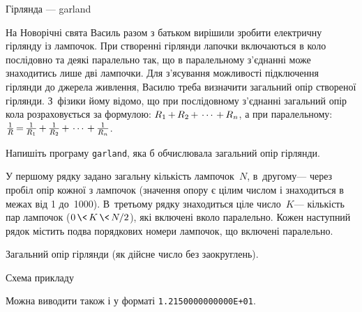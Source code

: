\begin{problemAllDefault}{Гірлянда --- garland}


На Новорічні свята Василь разом з батьком вирішили зробити електричну гірлянду із лампочок. При створенні гірлянди лапочки включаються в коло послідовно та деякі паралельно так, що в паралельному з’єднанні може знаходитись лише дві лампочки. Для з’ясування можливості підключення гірлянди до джерела живлення, Василю треба визначити загальний опір створеної гірлянди. З~фізики йому відомо, що при послідовному з’єднанні загальний опір кола розраховується за формулою: $R_1\dib{{+}}R_2\dib{{+}}\cdots\dib{{+}}R_n$, а при паралельному: $\frac{1}{R} \dib{{=}} \frac{1}{R_1} \dib{{+}} \frac{1}{R_2} \dib{{+}} \cdots \dib{{+}} \frac{1}{R_n}$.

\Task Напишіть програму \texttt{garland}, яка б обчислювала загальний опір гірлянди.

\InputFile У першому рядку задано загальну кількість лампочок~$N$, в~другому\nolinebreak[3] --- через пробіл опір кожної з лампочок (значення опору є цілим числом і знаходиться в межах від 1 до~1000). В~третьому рядку знаходиться ціле число~$K$\nolinebreak[3] --- кількість пар лампочок ($0\dib{{\<}}K\dib{{\<}}{N/2}$), які включені в\nolinebreak[3] коло паралельно. Кожен наступний рядок містить по\nolinebreak[2] два порядкових номери лампочок, що включені паралельно.

\OutputFile Загальний опір гірлянди (як дійсне число без заокруглень).

\Example

\vspace{-\baselineskip}

\begin{exampleSimpleThree}{6em}{3em}{14.5em}{Схема прикладу}
%
\end{exampleSimpleThree}


\Note %
Можна виводити також і у форматі \texttt{1.2150000000000E+01}.

\end{problemAllDefault}
